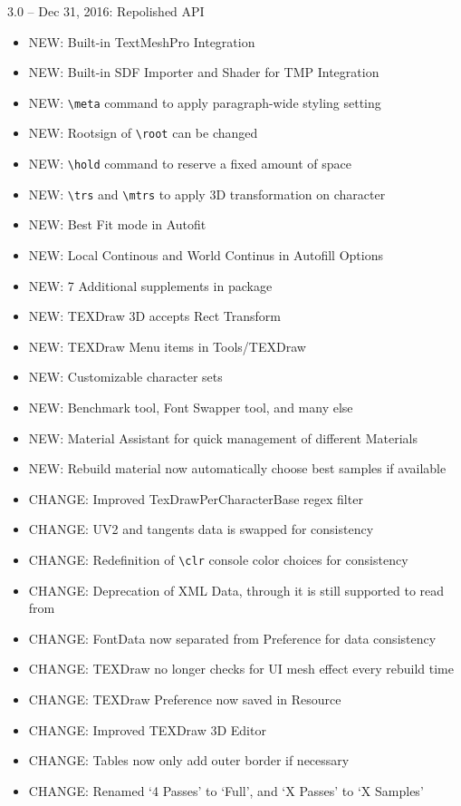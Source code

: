 \documentclass[12pt]{article}
\begin{document}
3.0 – Dec 31, 2016: Repolished API
\begin{itemize}
\item NEW: Built-in TextMeshPro Integration
\item NEW: Built-in SDF Importer and Shader for TMP Integration
\item NEW: \verb|\meta| command to apply paragraph-wide styling setting
\item NEW: Rootsign of \verb|\root| can be changed
\item NEW: \verb|\hold| command to reserve a fixed amount of space
\item NEW: \verb|\trs| and \verb|\mtrs| to apply 3D transformation on character
\item NEW: Best Fit mode in Autofit
\item NEW: Local Continous and World Continus in Autofill Options
\item NEW: 7 Additional supplements in package
\item NEW: TEXDraw 3D accepts Rect Transform
\item NEW: TEXDraw Menu items in Tools/TEXDraw
\item NEW: Customizable character sets
\item NEW: Benchmark tool, Font Swapper tool, and many else
\item NEW: Material Assistant for quick management of different Materials
\item NEW: Rebuild material now automatically choose best samples if available
\item CHANGE: Improved TexDrawPerCharacterBase regex filter
\item CHANGE: UV2 and tangents data is swapped for consistency
\item CHANGE: Redefinition of \verb|\clr| console color choices for consistency
\item CHANGE: Deprecation of XML Data, through it is still supported to read from
\item CHANGE: FontData now separated from Preference for data consistency
\item CHANGE: TEXDraw no longer checks for UI mesh effect every rebuild time
\item CHANGE: TEXDraw Preference now saved in Resource
\item CHANGE: Improved TEXDraw 3D Editor
\item CHANGE: Tables now only add outer border if necessary
\item CHANGE: Renamed ‘4 Passes’ to ‘Full’, and ‘X Passes’ to ‘X Samples’

\end{itemize}
\end{document}
